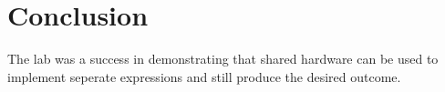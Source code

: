 \documentclass[12pt]{article}
\begin{document}
\section{Conclusion}
The lab was a success in demonstrating that shared hardware can be used to implement seperate expressions and still produce the desired outcome.
%
%
\end{document}
